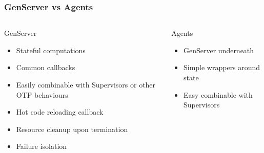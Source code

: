 \begin{frame}
    \frametitle{GenServer vs Agents}
    \begin{columns}
        \begin{column}[T]{0.5\textwidth}
            GenServer
            \vfill
            \begin{itemize}
                \small
                \item Stateful computations
                \item Common callbacks
                \item Easily combinable with Supervisors or other OTP behaviours
                \item Hot code reloading callback
                \item Resource cleanup upon termination
                \item Failure isolation
            \end{itemize}
        \end{column}
        \begin{column}[T]{0.5\textwidth}
            Agents
            \begin{itemize}
                \small
                \item GenServer underneath
                \item Simple wrappers around state
                \item Easy combinable with Supervisors
            \end{itemize}
        \end{column}
    \end{columns}
\end{frame}

